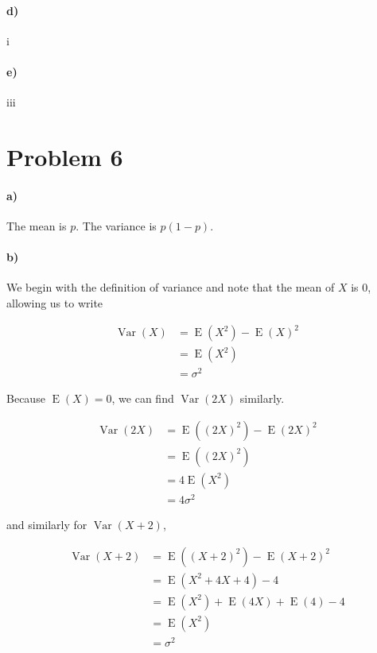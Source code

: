 \documentclass[12pt]{article}
\begin{document}
\paragraph{d)} i
\paragraph{e)} iii

\section*{Problem 6}

\paragraph{a)}

The mean is \(p\). The variance is \(p(1-p)\).

\paragraph{b)}

We begin with the definition of variance and note that the mean of \(X\) is \(0\), allowing us to write

\begin{align*}
        \operatorname{Var}(X)&=\operatorname{E}\left(X^2\right)-\operatorname{E}(X)^2\\
        &=\operatorname{E}\left(X^2\right)\\
        &=\sigma^2
\end{align*}

Because \(\operatorname{E}(X)=0\), we can find \(\operatorname{Var}(2X)\) similarly.

\begin{align*}
        \operatorname{Var}(2X)&=\operatorname{E}\left((2X)^2\right)-\operatorname{E}(2X)^2\\
        &=\operatorname{E}\left((2X)^2\right)\\
        &=4\operatorname{E}\left(X^2\right)\\
        &=4\sigma^2
\end{align*}

and similarly for \(\operatorname{Var}(X+2)\),

\begin{align*}
        \operatorname{Var}(X+2)&=\operatorname{E}\left((X+2)^2\right)-\operatorname{E}(X+2)^2\\
        &=\operatorname{E}\left(X^2+4X+4\right)-4\\
        &=\operatorname{E}\left(X^2\right)+\operatorname{E}(4X)+\operatorname{E}(4)-4\\
        &=\operatorname{E}\left(X^2\right)\\
        &=\sigma^2
\end{align*}
\end{document}

